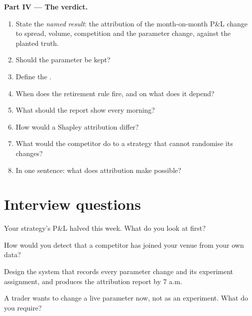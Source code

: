 \begin{problem}
\medskip\noindent\textbf{Part IV --- The verdict.}
\begin{enumerate}[resume]
\item State the \emph{named result}: the attribution of the month-on-month P\&L change to spread, volume, competition and the parameter change,
against the planted truth.
\item Should the parameter be kept?
\item Define the .
\item When does the retirement rule fire, and on what does it depend?
\item What should the report show every morning?
\item How would a Shapley attribution differ?
\item What would the competitor do to a strategy that cannot randomise its changes?
\item In one sentence: what does attribution make possible?
\end{enumerate}
\end{problem}

\section{Interview questions}

\begin{interviewq}\label{iq:hf:pnl-analytics-and-the-strategy-lifecycle:1}
Your strategy's P\&L halved this week. What do you look at first?
\end{interviewq}

\begin{interviewq}\label{iq:hf:pnl-analytics-and-the-strategy-lifecycle:2}
How would you detect that a competitor has joined your venue from your own data?
\end{interviewq}

\begin{interviewq}\label{iq:hf:pnl-analytics-and-the-strategy-lifecycle:3}
Design the system that records every parameter change and its experiment assignment, and produces the attribution report by 7 a.m.
\end{interviewq}

\begin{interviewq}\label{iq:hf:pnl-analytics-and-the-strategy-lifecycle:4}
A trader wants to change a live parameter now, not as an experiment. What do you require?
\end{interviewq}

